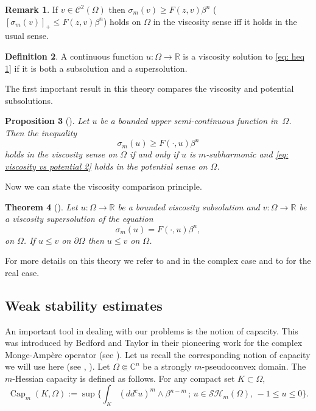 \documentclass[JEP,XML,SOM,Unicode]{cedram}
\newcommand{\sep}{\,;\,}
\newtheorem{theorem}{Theorem}[section]
\newtheorem{proposition}[theorem]{Proposition}
\theoremstyle{definition}
\newtheorem{definition}[theorem]{Definition}
\newtheorem{remark}[theorem]{Remark}
\newcommand{\R}{\mathbb{R}}
\renewcommand{\C}{\mathbb{C}}
\newcommand{\Cc}{\mathcal{C}}
\DeclareMathOperator{\Capa}{Cap}
\begin{document}
\begin{remark} If $v \in \Cc^2 (\Omega)$ then $\sigma_m(v)\geq F(z,v)\beta^n$ (\resp $[\sigma_m(v)]_+\leq F(z,v)\beta^n$) holds on $\Omega$ in the viscosity sense iff it holds in the usual sense.
\end{remark}

\begin{definition}
A continuous function $u: \Omega \to \R$ is a viscosity solution to \eqref{eq: heq 1} if it is both a subsolution and a supersolution.
\end{definition}

The first important result in this theory compares the viscosity and potential subsolutions.

\begin{proposition}[\cite{Lu13}] \label{prop: viscosity vs potential general case}
Let $u$ be a bounded upper semi-continuous function in~$\Omega$. Then the inequality
\begin{equation}\label{eq: viscosity vs potential 2}
\sigma_m (u)\geq F(\cdot,u)\beta^n
\end{equation}
holds in the viscosity sense on $\Omega$ if and only if $u$ is $m$-subharmonic and \eqref{eq: viscosity vs potential 2} holds in the potential sense on $\Omega$.
\end{proposition}

Now we can state the viscosity comparison principle.

\begin{theorem} [\cite{Lu13}]\label{thm: viscosity comparison principle}
Let $u: \Omega \to \R$ be a bounded viscosity subsolution and $v: \Omega \to \R$ be a viscosity supersolution of the equation
\[
\sigma_m(u)=F(\cdot,u)\beta^n,
\]
on $\Omega$. If $u \leq v$ on $\partial \Omega$ then $u\leq v$ on $\Omega$.
\end{theorem}

For more details on this theory we refer to \cite{Lu13} and \cite{EGZ11} in the complex case and to \cite{CIL92} for the real case.

\subsection{Weak stability estimates}

An important tool in dealing with our problems is the notion of capacity. This was introduced by Bedford and Taylor in their pioneering work for the complex Monge-Ampère operator (see \cite{BT82}).
Let us recall the corresponding notion of capacity we will use here (see \cite{Lu12}, \cite{SA13}). Let $\Omega \Subset \C^n$ be a strongly $m$-pseudoconvex domain. The $m$-Hessian capacity is defined as follows. For any compact set $K \subset \Omega$,
\[
\Capa_m(K,\Omega):= \sup \bigl\{\textstyle\int_K (dd^c u)^m \wedge \beta^{n - m} \sep u \in \mathcal{SH}_m (\Omega),\, - 1 \leq u \leq 0\bigr\}.
\]
\end{document}

